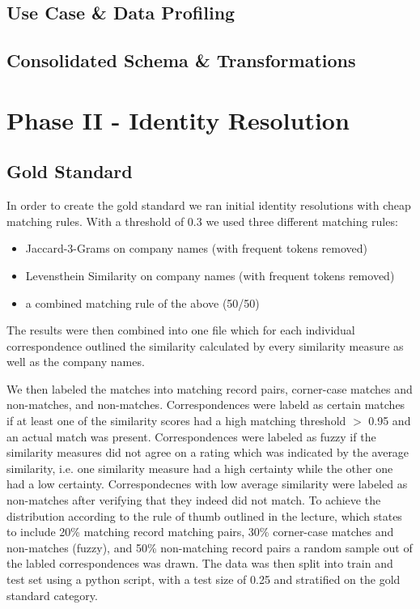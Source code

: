 \documentclass[11pt,titlepage,oneside,openany]{book}
\begin{document}
 
\section{Use Case \& Data Profiling}


\section{Consolidated Schema \& Transformations}


\chapter{Phase II - Identity Resolution}
\label{cha:identity-resolution}

\section{Gold Standard}
\label{sec:gold-standard-IR}

In order to create the gold standard we ran initial identity resolutions with cheap matching rules. With a threshold of 0.3 we used three different matching rules: \begin{itemize}
	\item Jaccard-3-Grams on company names (with frequent tokens removed)
	\item Levensthein Similarity on company names (with frequent tokens removed)
	\item a combined matching rule of the above (50/50) 
\end{itemize}
The results were then combined into one file which for each individual correspondence outlined the similarity calculated by every similarity measure as well as the company names.

We then labeled the matches into matching record pairs, corner-case matches and non-matches, and non-matches. 
Correspondences were labeld as certain matches if at least one of the similarity scores had a high matching threshold $>$ 0.95 and an actual match was present.
Correspondences were labeled as fuzzy if the similarity measures did not agree on a rating which was indicated by the average similarity, i.e. one similarity measure had a high certainty while the other one had a low certainty.
Correspondecnes with low average similarity were labeled as non-matches after verifying that they indeed did not match.
To achieve the distribution according to the rule of thumb outlined in the lecture, which states to include 20\% matching record matching pairs, 30\% corner-case matches and non-matches (fuzzy), and 50\% non-matching record pairs a random sample out of the labled correspondences was drawn.
The data was then split into train and test set using a python script, with a test size of 0.25 and stratified on the gold standard category.
\end{document}
